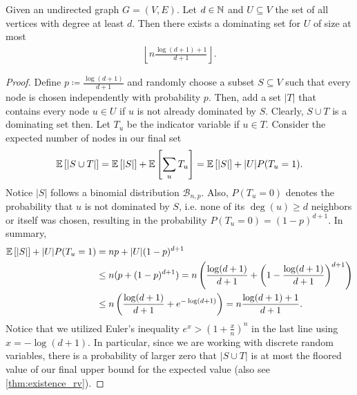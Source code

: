 \begin{aufgabe}
	Given an undirected graph $G=(V,E)$.
	Let $d \in \mathbb{N}$ and $U \subseteq V$ the set of all vertices with degree at least $d$.
	Then there exists a dominating set for $U$ of size at most
	\begin{align*}
		\left\lfloor n \frac{\log(d+1)+1}{d+1} \right\rfloor.
	\end{align*}
	\begin{proof}
		Define $p \coloneqq \frac{\log(d+1)}{d+1}$ and randomly choose a subset $S \subseteq V$
		such that every node is chosen independently with probability $p$.
		Then, add a set $|T|$ that contains every node $u \in U$ if $u$ is not already dominated by $S$.
		Clearly, $S\cup T$ is a dominating set then.
		Let $T_u$ be the indicator variable if $u \in T$.
		Consider the expected number of nodes in our final set
		\begin{align*}
			\mathbb{E}\left[|S \cup T|\right] = \mathbb{E}\left[|S|\right] + \mathbb{E}\left[\sum_u T_u\right] = \mathbb{E}\left[|S|\right] + |U|P(T_u=1).
		\end{align*}
		Notice $|S|$ follows a binomial distribution $\mathcal{B}_{n,p}$.
		Also, $P(T_u=0)$ denotes the probability that $u$ is not dominated by $S$,
		i.e. none of its $\deg(u) \geq d$ neighbors or itself was chosen, resulting in
		the probability $P(T_u=0) = (1-p)^{d+1}$. In summary,
		\begin{align*}
			\mathbb{E}\left[|S|\right] + |U|P(T_u=1) & = np + |U|(1-p)^{d+1}                                                                                          \\
			                           & \leq n (p + (1-p)^{d+1}) = n \left( \frac{\log(d+1)}{d+1} + \left(1-\frac{\log(d+1)}{d+1}\right)^{d+1} \right) \\
			                           & \leq n \left( \frac{\log(d+1)}{d+1} + e^{-\log(d+1)} \right) = n \frac{\log(d+1) + 1}{d+1}.                    \\
		\end{align*}
		Notice that we utilized Euler's inequality $e^x > (1+ \frac{x}{n})^n$ in the last line using $x = -\log(d+1)$.
		In particular, since we are working with discrete random variables,
		there is a probability of larger zero that $|S \cup T|$ is at most the floored value of our final upper bound for the expected value (also see \autoref{thm:existence_rv}).
	\end{proof}
\end{aufgabe}
